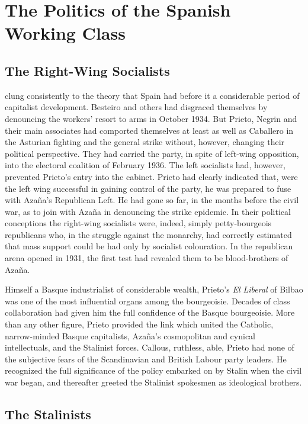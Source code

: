 \chapter{The Politics of the Spanish Working Class}

\section{The Right-Wing Socialists}

 clung consistently to the theory that Spain had before it a considerable period of capitalist development. Besteiro and others had disgraced themselves by denouncing the workers’ resort to arms in October 1934. But Prieto, Negrin and their main associates had comported themselves at least as well as Caballero in the Asturian fighting and the general strike without, however, changing their political perspective. They had carried the party, in spite of left-wing opposition, into the electoral coalition of February 1936. The left socialists had, however, prevented Prieto’s entry into the cabinet. Prieto had clearly indicated that, were the left wing successful in gaining control of the party, he was prepared to fuse with Azaña’s Republican Left. He had gone so far, in the months before the civil war, as to join with Azaña in denouncing the strike epidemic. In their political conceptions the right-wing socialists were, indeed, simply petty-bourgeois republicans who, in the struggle against the monarchy, had correctly estimated that mass support could be had only by socialist colouration. In the republican arena opened in 1931, the first test had revealed them to be blood-brothers of Azaña.

Himself a Basque industrialist of considerable wealth, Prieto’s \emph{El Liberal} of Bilbao was one of the most influential organs among the bourgeoisie. Decades of class collaboration had given him the full confidence of the Basque bourgeoisie. More than any other figure, Prieto provided the link which united the Catholic, narrow-minded Basque capitalists, Azaña’s cosmopolitan and cynical intellectuals, and the Stalinist forces. Callous, ruthless, able, Prieto had none of the subjective fears of the Scandinavian and British Labour party leaders. He recognized the full significance of the policy embarked on by Stalin when the civil war began, and thereafter greeted the Stalinist spokesmen as ideological brothers.

\section{The Stalinists}


